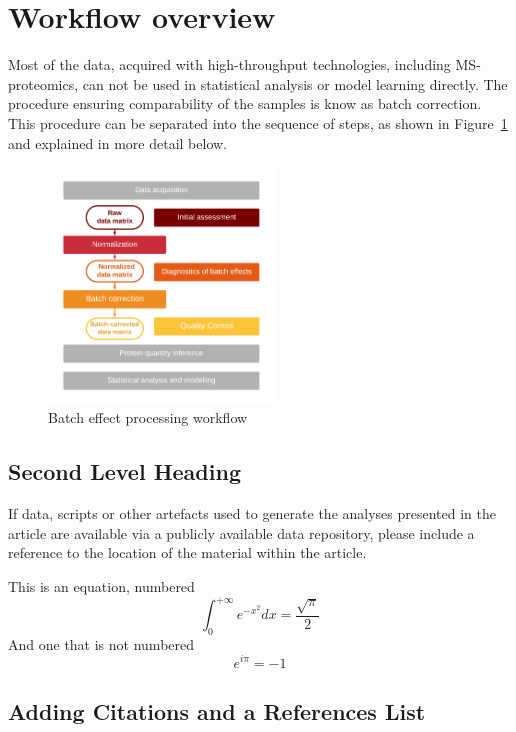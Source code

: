 \documentclass[alpha-refs]{wiley-article}
\begin{document}
\section{Workflow overview}
Most of the data, acquired with high-throughput technologies, including MS-proteomics, can not be used in statistical analysis or model learning directly. The procedure ensuring comparability of the samples is know as batch correction. This procedure can be separated into the sequence of steps, as shown in Figure~\ref{fig:batch_fig1_workflow} and explained in more detail below.  
\begin{figure}[bt]
	\center
	\includegraphics[width=6cm]{figures/Fig0_workflow_staircase}
	\caption[Batch effect correction workflow]
	{Batch effect processing workflow}
	\label{fig:batch_fig1_workflow}
\end{figure}

\subsection{Second Level Heading}
If data, scripts or other artefacts used to generate the analyses presented in the article are available via a publicly available data repository, please include a reference to the location of the material within the article.

This is an equation, numbered
\begin{equation}
\int_0^{+\infty}e^{-x^2}dx=\frac{\sqrt{\pi}}{2}
\end{equation}
And one that is not numbered
\begin{equation*}
e^{i\pi}=-1
\end{equation*}

\subsection{Adding Citations and a References List}
\end{document}

